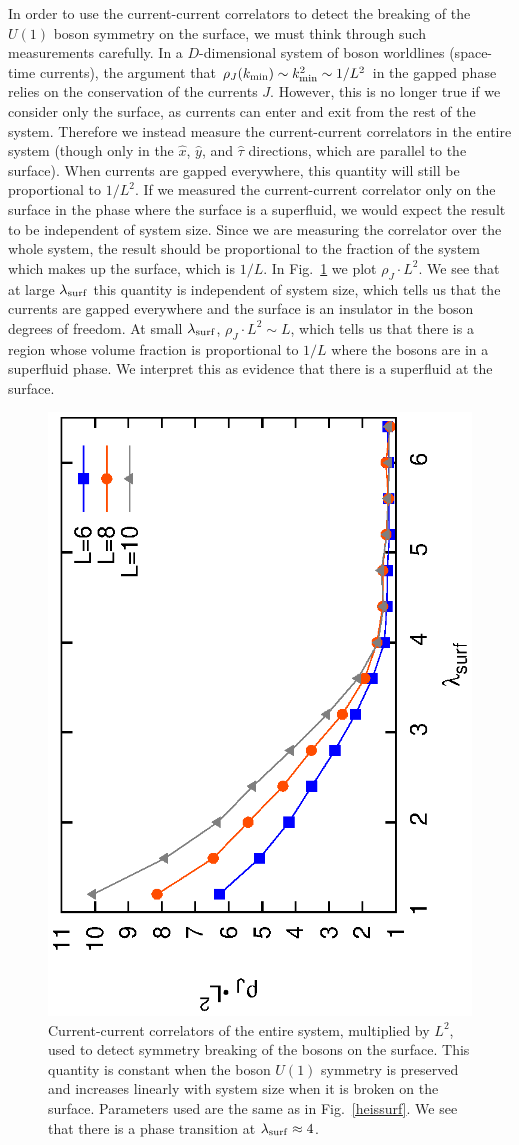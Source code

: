 In order to use the current-current correlators to detect the breaking of the $U(1)$ boson symmetry on the surface, we must think through such measurements carefully.  In a $D$-dimensional system of boson worldlines (space-time currents), the argument that $\rho_J(k_{\rm min}) \sim k_{\rm min}^2 \sim 1/L^2$ in the gapped phase relies on the conservation of the currents $J$.  However, this is no longer true if we consider only the surface, as currents can enter and exit from the rest of the system.  
Therefore we instead measure the current-current correlators in the entire system (though only in the $\hat{x}$, $\hat{y}$, and $\hat{\tau}$ directions, which are parallel to the surface). When currents are gapped everywhere, this quantity will still be proportional to $1/L^2$. 
If we measured the current-current correlator only on the surface in the phase where the surface is a superfluid, we would expect the result to be independent of system size. Since we are measuring the correlator over the whole system, the result should be proportional to the fraction of the system which makes up the surface, which is $1/L$.
In Fig.~\ref{slabcurs} we plot $\rho_J \cdot L^2$. We see that at large $\lambda_{\rm surf}$ this quantity is independent of system size, which tells us that the currents are gapped everywhere and the surface is an insulator in the boson degrees of freedom. At small $\lambda_{\rm surf}$, $\rho_J\cdot L^2 \sim L$, which tells us that there is a region whose volume fraction is proportional to $1/L$ where the bosons are in a superfluid phase. We interpret this as evidence that there is a superfluid at the surface.


\begin{figure}
\includegraphics[angle=-90,width=0.6\linewidth]{figures/slabcurs.eps}
\caption{Current-current correlators of the entire system, multiplied by $L^2$, used to detect symmetry breaking of the bosons on the surface. This quantity is constant when the boson $U(1)$ symmetry is preserved and increases linearly with system size when it is broken on the surface. Parameters used are the same as in Fig.~\ref{heissurf}. We see that there is a phase transition at $\lambda_{\rm surf}\approx 4$.
}
\label{slabcurs}
\end{figure} 


